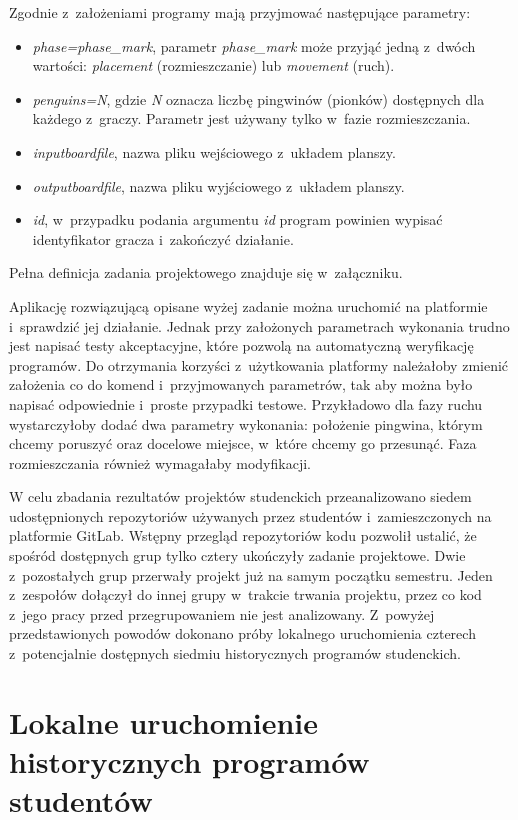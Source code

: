 Zgodnie z~założeniami programy mają przyjmować następujące parametry:
\begin{itemize}
    \item \textit{phase=phase\_mark}, parametr \textit{phase\_mark} może przyjąć jedną z~dwóch wartości: \textit{placement} (rozmieszczanie) lub \textit{movement} (ruch).
    \item \textit{penguins=N}, gdzie \textit{N} oznacza liczbę pingwinów (pionków) dostępnych dla każdego z~graczy.
    Parametr jest używany tylko w~fazie rozmieszczania.
    \item \textit{inputboardfile}, nazwa pliku wejściowego z~układem planszy.
    \item \textit{outputboardfile}, nazwa pliku wyjściowego z~układem planszy.
    \item \textit{id}, w~przypadku podania argumentu \textit{id} program powinien wypisać identyfikator gracza i~zakończyć działanie.
\end{itemize}
Pełna definicja zadania projektowego znajduje się w~załączniku.

Aplikację rozwiązującą opisane wyżej zadanie można uruchomić na platformie i~sprawdzić jej działanie.
Jednak przy założonych parametrach wykonania trudno jest napisać testy akceptacyjne, które pozwolą na automatyczną weryfikację programów.
Do otrzymania korzyści z~użytkowania platformy należałoby zmienić założenia co do komend i~przyjmowanych parametrów, tak aby można było napisać odpowiednie i~proste przypadki testowe.
Przykładowo dla fazy ruchu wystarczyłoby dodać dwa parametry wykonania: położenie pingwina, którym chcemy poruszyć oraz docelowe miejsce, w~które chcemy go przesunąć.
Faza rozmieszczania również wymagałaby modyfikacji.

W celu zbadania rezultatów projektów studenckich przeanalizowano siedem udostępnionych repozytoriów używanych przez studentów i~zamieszczonych na platformie GitLab.
Wstępny przegląd repozytoriów kodu pozwolił ustalić, że spośród dostępnych grup tylko cztery ukończyły zadanie projektowe.
Dwie z~pozostałych grup przerwały projekt już na samym początku semestru.
Jeden z~zespołów dołączył do innej grupy w~trakcie trwania projektu, przez co kod z~jego pracy przed przegrupowaniem nie jest analizowany.
Z~powyżej przedstawionych powodów dokonano próby lokalnego uruchomienia czterech z~potencjalnie dostępnych siedmiu historycznych programów studenckich.

\section{Lokalne uruchomienie historycznych programów studentów}

